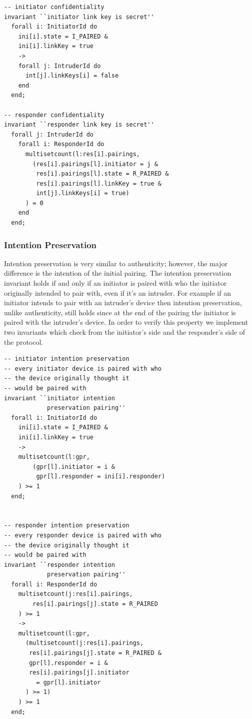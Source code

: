 \documentclass{acm_proc_article-sp}
\begin{document}
\begin{verbatim}
-- initiator confidentiality
invariant ``initiator link key is secret''
  forall i: InitiatorId do
    ini[i].state = I_PAIRED &
    ini[i].linkKey = true
    ->
    forall j: IntruderId do
      int[j].linkKeys[i] = false
    end
  end;

-- responder confidentiality
invariant ``responder link key is secret''
  forall j: IntruderId do
    forall i: ResponderId do
      multisetcount(l:res[i].pairings, 
        (res[i].pairings[l].initiator = j & 
         res[i].pairings[l].state = R_PAIRED & 
         res[i].pairings[l].linkKey = true & 
         int[j].linkKeys[i] = true)
      ) = 0
    end
  end;
\end{verbatim}

\subsubsection{Intention Preservation}
Intention preservation is very similar to authenticity; however, the major difference is the intention of the initial pairing. The intention preservation invariant holds if and only if an initiator is paired with who the initiator originally intended to pair with, even if it's an intruder. For example if an initiator intends to pair with an intruder's device then intention preservation, unlike authenticity, still holds since at the end of the pairing the initiator is paired with the intruder's device. In order to verify this property we implement two invariants which check from the initiator's side and the responder's side of the protocol.

\begin{verbatim}
-- initiator intention preservation
-- every initiator device is paired with who 
-- the device originally thought it 
-- would be paired with
invariant ``initiator intention 
            preservation pairing''
  forall i: InitiatorId do
    ini[i].state = I_PAIRED &
    ini[i].linkKey = true
    ->
    multisetcount(l:gpr,
        (gpr[l].initiator = i &
         gpr[l].responder = ini[i].responder)
    ) >= 1
  end;


-- responder intention preservation
-- every responder device is paired with who 
-- the device originally thought it 
-- would be paired with
invariant ``responder intention 
            preservation pairing''
  forall i: ResponderId do
    multisetcount(j:res[i].pairings,
        res[i].pairings[j].state = R_PAIRED
    ) >= 1
    ->
    multisetcount(l:gpr,
      (multisetcount(j:res[i].pairings,
       res[i].pairings[j].state = R_PAIRED &
       gpr[l].responder = i &
       res[i].pairings[j].initiator 
         = gpr[l].initiator
      ) >= 1)
    ) >= 1
  end;
\end{verbatim}
\end{document}
